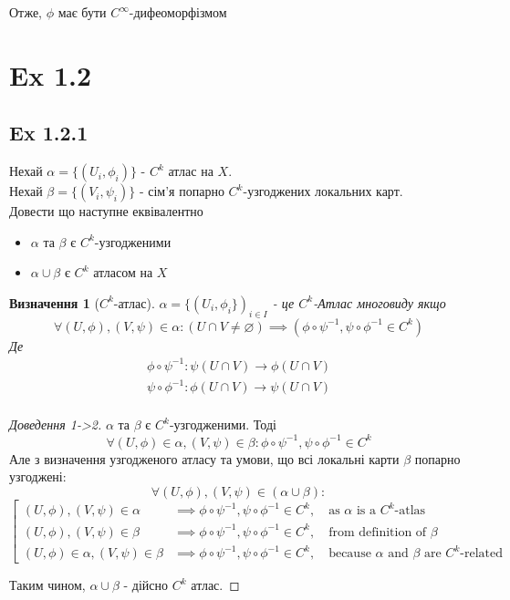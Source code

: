 \documentclass[10pt, a4paper]{article} %
\newtheorem*{definition}{Визначення}
\begin{document}
Отже, $\phi$ має бути $C^\infty$-дифеоморфізмом 



\section*{Ex 1.2}
\subsection*{Ex 1.2.1}
\begin{mdframed}
    Нехай $\alpha = \{(U_i,\phi_i)\}$ - $C^k$ атлас на $X$.\\
    Нехай $\beta = \{(V_i,\psi_i)\}$ - сім'я попарно $C^k$-узгоджених локальних карт.\\
    Довести що наступне еквівалентно 
    \begin{itemize}
        \item $\alpha$ та $\beta$ є $C^k$-узгодженими
        \item $\alpha\cup\beta$ є $C^k$ атласом на $X$
    \end{itemize}
\end{mdframed}

\begin{definition}[$C^k$-атлас]
    $\alpha = \{(U_{i}, \phi_{i}\})_{i\in I}$ - це  $C^k$-Атлас многовиду якщо
    \[\forall (U,\phi), (V,\psi) \in \alpha: (U\cap V \ne \varnothing) \implies \left(\phi\circ\psi^{-1}, \psi\circ\phi^{-1} \in C^k\right)\]
    Де 
    \begin{gather*}
        \phi\circ\psi^{-1} : \psi(U\cap V) \to \phi(U\cap V)\\
        \psi\circ\phi^{-1} : \phi(U\cap V) \to \psi(U\cap V)\\
    \end{gather*}
\end{definition}

\begin{proof}[Доведення 1->2]
    $\alpha$ та $\beta$ є $C^k$-узгодженими.
    Тоді 
    \[\forall (U,\phi) \in \alpha, (V,\psi) \in \beta: \phi \circ \psi^{-1}, \psi \circ \phi^{-1} \in C^k\]
    Але з визначення узгодженого атласу та умови, що всі локальні карти $\beta$ попарно узгоджені: 
    \[\forall (U,\phi),(V,\psi) \in (\alpha\cup\beta): \]
    \[\left[\begin{array}{ll}
        (U,\phi),(V,\psi) \in \alpha &\implies \phi\circ\psi^{-1}, \psi \circ \phi^{-1} \in C^k,\quad \text{as $\alpha$ is a $C^k$-atlas} \\
        (U,\phi),(V,\psi) \in \beta &\implies \phi\circ\psi^{-1}, \psi \circ \phi^{-1} \in C^k,\quad \text{from definition of } \beta \\
        (U,\phi) \in \alpha, (V,\psi) \in \beta & \implies \phi\circ\psi^{-1}, \psi \circ \phi^{-1} \in C^k, \quad \text{because $\alpha$ and $\beta$ are $C^k$-related} 
    \end{array}\right.\]

    Таким чином, $\alpha\cup\beta$ - дійсно $C^k$ атлас.
\end{proof}
\end{document}
